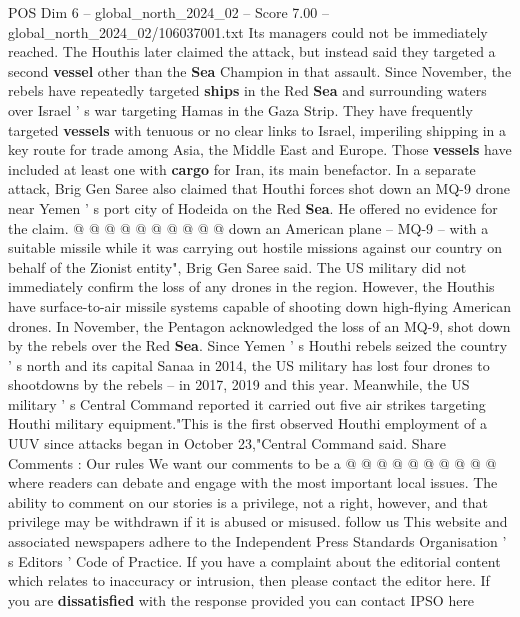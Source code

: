 \begin{textsample}{POS Dim 6 – global\_north\_2024\_02 – Score 7.00 – global\_north\_2024\_02/106037001.txt}
Its managers could not be immediately reached.
The Houthis later claimed the attack, but instead said they targeted a second \textbf{vessel} other than the \textbf{Sea} Champion in that assault.
Since November, the rebels have repeatedly targeted \textbf{ships} in the Red \textbf{Sea} and surrounding waters over Israel ' s war targeting Hamas in the Gaza Strip.
They have frequently targeted \textbf{vessels} with tenuous or no clear links to Israel, imperiling shipping in a key route for trade among Asia, the Middle East and Europe.
Those \textbf{vessels} have included at least one with \textbf{cargo} for Iran, its main benefactor.
In a separate attack, Brig Gen Saree also claimed that Houthi forces shot down an MQ-9 drone near Yemen ' s port city of Hodeida on the Red \textbf{Sea}.
He offered no evidence for the claim. @ @ @ @ @ @ @ @ @ @ down an American plane -- MQ-9 -- with a suitable missile while it was carrying out hostile missions against our country on behalf of the Zionist entity", Brig Gen Saree said.
The US military did not immediately confirm the loss of any drones in the region.
However, the Houthis have surface-to-air missile systems capable of shooting down high-flying American drones.
In November, the Pentagon acknowledged the loss of an MQ-9, shot down by the rebels over the Red \textbf{Sea}.
Since Yemen ' s Houthi rebels seized the country ' s north and its capital Sanaa in 2014, the US military has lost four drones to shootdowns by the rebels -- in 2017, 2019 and this year.
Meanwhile, the US military ' s Central Command reported it carried out five air strikes targeting Houthi military equipment."This is the first observed Houthi employment of a UUV since attacks began in October 23,"Central Command said.
Share Comments : Our rules We want our comments to be a @ @ @ @ @ @ @ @ @ @ where readers can debate and engage with the most important local issues.
The ability to comment on our stories is a privilege, not a right, however, and that privilege may be withdrawn if it is abused or misused. follow us This website and associated newspapers adhere to the Independent Press Standards Organisation ' s Editors ' Code of Practice.
If you have a complaint about the editorial content which relates to inaccuracy or intrusion, then please contact the editor here.
If you are \textbf{dissatisfied} with the response provided you can contact IPSO here

\end{textsample}
